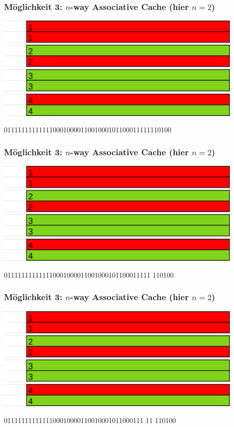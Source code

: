 \documentclass{beamer}
\begin{document}
\begin{frame}
\frametitle{M\"oglichkeit 3: $n$-way Associative Cache (hier $n=2$)}
\centerline{\includegraphics[width=12cm]{nac1.png}}
011111111111110001000011001000101100011111110100
\end{frame}

\begin{frame}
\frametitle{M\"oglichkeit 3: $n$-way Associative Cache (hier $n=2$)}
\centerline{\includegraphics[width=12cm]{nac1.png}}
011111111111110001000011001000101100011111 {\color{orange}110100}
\end{frame}

\begin{frame}
\frametitle{M\"oglichkeit 3: $n$-way Associative Cache (hier $n=2$)}
\centerline{\includegraphics[width=12cm]{nac1.png}}
0111111111111100010000110010001011000111 {\color{blue}11} {\color{orange}110100}
\end{frame}
\end{document}
